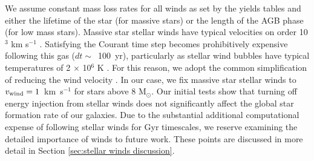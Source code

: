 \documentclass[twocolumn]{aastex61}
\newcommand{\ccunit}{cm$^{-3}$}
\begin{document}
We assume constant mass loss rates for all winds as set by the yields tables and either the lifetime of the star (for massive stars) or the length of the AGB phase (for low mass stars). 
Massive star stellar winds have typical velocities on order 10$^{3}$ km s$^{-1}$ \citep{Leitherer1992}. Satisfying the Courant time step becomes prohibitively expensive following this gas ($dt \sim$~100~yr), particularly as stellar wind bubbles have typical temperatures of 2 $\times$ 10$^{6}$ K \citep{Weaver1977}. For this reason, we adopt the common simplification of reducing the wind velocity \citep[e.g][]{Offner2015}. In our case, we fix massive star stellar winds to $v_{\rm wind} = 1$~km~s$^{-1}$ for stars above 8 M$_{\odot}$. Our initial tests show that turning off energy injection from stellar winds does not significantly affect the global star formation rate of our galaxies. Due to the substantial additional computational expense of following stellar winds for Gyr timescales, we reserve examining the detailed importance of winds to future work. These points are discussed in more detail in Section \ref{sec:stellar winds discussion}.

\end{document}

